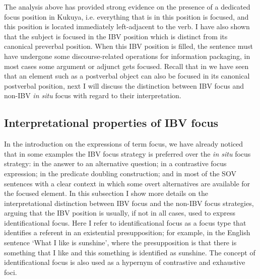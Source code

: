 \documentclass[output=paper,colorlinks,citecolor=brown,
]{langscibook}
\begin{document}
The analysis above has provided strong evidence on the presence of a dedicated focus position in Kukuya, i.e. everything that is in this position is focused, and this position is located immediately left-adjacent to the verb. I have also shown that the subject is focused in the IBV position which is distinct from its canonical preverbal position. When this IBV position is filled, the sentence must have undergone some discourse-related operations for information packaging, in most cases some argument or adjunct gets focused. Recall that in  we have seen that an element such as a postverbal object can also be focused in its canonical postverbal position, next I will discuss the distinction between IBV focus and non-IBV \textit{in situ} focus with regard to their interpretation.
\subsection{Interpretational properties of IBV focus}\label{teke:sec:3.4}
In the introduction on the expressions of term focus, we have already noticed that in some examples the IBV focus strategy is preferred over the \textit{in situ} focus strategy: in the answer to an alternative question; in a contrastive focus expression; in the predicate doubling construction; and in most of the SOV sentences with a clear context in which some overt alternatives are available for the focused element. In this subsection I show more details on the interpretational distinction between IBV focus and the non-IBV focus strategies, arguing that the IBV position is usually, if not in all cases, used to express identificational focus. Here I refer to identificational focus as a focus type that identifies a referent in an existential presupposition; for example, in the English sentence `What I like is sunshine', where the presupposition is that there is something that I like and this something is identified as sunshine. The concept of identificational focus is also used as a hypernym of contrastive and exhaustive foci.
\end{document}
